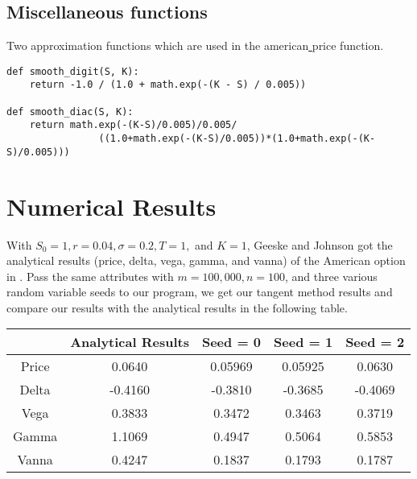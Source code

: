 \documentclass[11pt, oneside]{article}   	%
\begin{document}
\subsection{Miscellaneous functions}
Two approximation functions which are used in the american\underline{ }price function. 
\lstset{language=Python}
\lstset{frame=lines}
\lstset{basicstyle=\footnotesize}
\begin{lstlisting}
def smooth_digit(S, K):
    return -1.0 / (1.0 + math.exp(-(K - S) / 0.005))

def smooth_diac(S, K):
    return math.exp(-(K-S)/0.005)/0.005/
    		    ((1.0+math.exp(-(K-S)/0.005))*(1.0+math.exp(-(K-S)/0.005)))
\end{lstlisting}

\section{Numerical Results}
With $S_0= 1,  r = 0.04,  \sigma = 0.2, T = 1,$ and $K=1$, Geeske and Johnson got the analytical results (price, delta, vega, gamma, and vanna) of the American option in \cite{https://doi.org/10.1111/j.1540-6261.1984.tb04921.x}.
Pass the same attributes with $ m = 100,000, n =100$, and three various random variable seeds to our program, we get our tangent method results and compare our results with the analytical results in the following table.
\begin{center}
 \begin{tabular}{||c c c c c||} 
 \hline
  & Analytical Results& Seed = 0 & Seed = 1 &Seed = 2 \\ [0.5ex] 
 \hline\hline
 Price & 0.0640 &0.05969&0.05925& 0.0630\\ 
 \hline
 Delta & -0.4160 & -0.3810 &-0.3685 &  -0.4069\\
 \hline
 Vega &0.3833 & 0.3472 &  0.3463&0.3719\\
 \hline
 Gamma & 1.1069 & 0.4947 &0.5064 & 0.5853 \\
 \hline
 Vanna & 0.4247 & 0.1837 & 0.1793 & 0.1787\\ [1ex] 
 \hline
\end{tabular}
\end{center}



\end{document}
